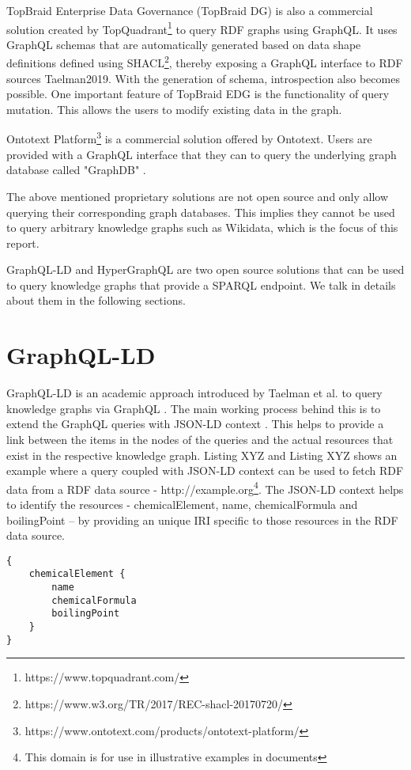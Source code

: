 TopBraid Enterprise Data Governance (TopBraid DG) is also a commercial solution created by TopQuadrant\footnote{https://www.topquadrant.com/} to query RDF graphs using GraphQL. It uses GraphQL schemas that are automatically generated based on data shape definitions defined using SHACL\footnote{https://www.w3.org/TR/2017/REC-shacl-20170720/}, thereby exposing a GraphQL interface to RDF sources {Taelman2019}. With the generation of schema, introspection also becomes possible. One important feature of TopBraid EDG is the functionality of query mutation. This allows the users to modify existing data in the graph.

Ontotext Platform\footnote{https://www.ontotext.com/products/ontotext-platform/} is a commercial solution offered by Ontotext. Users are provided with a GraphQL interface that they can to query the underlying graph database called "GraphDB" \cite{Angele2022}. 

The above mentioned proprietary solutions are not open source and only allow querying their corresponding graph databases. This implies they cannot be used to query arbitrary knowledge graphs such as Wikidata, which is the focus of this report.

GraphQL-LD and HyperGraphQL are two open source solutions that can be used to query knowledge graphs that provide a SPARQL endpoint. We talk in details about them in the following sections.

\section{GraphQL-LD}

GraphQL-LD is an academic approach introduced by Taelman et al. to query knowledge graphs via GraphQL \cite{Taelman2018}. The main working process behind this is to extend the GraphQL queries with JSON-LD context \cite{Sporny2014}. This helps to provide a link between the items in the nodes of the queries and the actual resources that exist in the respective knowledge graph. Listing XYZ and Listing XYZ shows an example where a query coupled with JSON-LD context can be used to fetch RDF data from a RDF data source - http://example.org\footnote{This domain is for use in illustrative examples in documents}. The JSON-LD context helps to identify the resources - chemicalElement, name, chemicalFormula and boilingPoint – by providing an unique IRI specific to those resources in the RDF data source.

\begin{minipage}{\linewidth}
\begin{lstlisting}[label=listing:listing6, caption={GraphQL query}]
{
	chemicalElement {
		name
		chemicalFormula
		boilingPoint
	}
}
\end{lstlisting}
\end{minipage}

